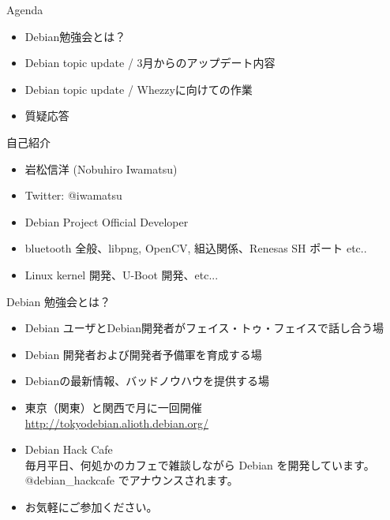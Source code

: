 \frame{\titlepage{}}


\begin{frame}{Agenda}
 \begin{itemize}
  \item Debian勉強会とは？
  \item Debian topic update / 3月からのアップデート内容
  \item Debian topic update / Whezzyに向けての作業
  \item 質疑応答
 \end{itemize}
\end{frame}

\begin{frame}{自己紹介}
\begin{itemize}
\item 岩松信洋 (Nobuhiro Iwamatsu)
\item Twitter: @iwamatsu
\item Debian Project Official Developer
\item bluetooth 全般、libpng, OpenCV, 組込関係、Renesas SH ポート etc..
\item Linux kernel 開発、U-Boot 開発、etc...
\end{itemize}
\end{frame}


\begin{frame}{Debian 勉強会とは？}
\begin{itemize}
\item Debian ユーザとDebian開発者がフェイス・トゥ・フェイスで話し合う場
\item Debian 開発者および開発者予備軍を育成する場
\item Debianの最新情報、バッドノウハウを提供する場
\item 東京（関東）と関西で月に一回開催\\
\url{http://tokyodebian.alioth.debian.org/}
\item Debian Hack Cafe\\
毎月平日、何処かのカフェで雑談しながら Debian を開発しています。\\
@debian\_hackcafe でアナウンスされます。\\
\item お気軽にご参加ください。
\end{itemize}
\end{frame}


